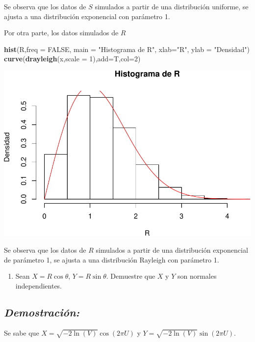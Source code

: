 \documentclass[]{article}
\newenvironment{Shaded}{\begin{snugshade}}{\end{snugshade}}
\newcommand{\KeywordTok}[1]{\textcolor[rgb]{0.13,0.29,0.53}{\textbf{#1}}}
\newcommand{\DataTypeTok}[1]{\textcolor[rgb]{0.13,0.29,0.53}{#1}}
\newcommand{\DecValTok}[1]{\textcolor[rgb]{0.00,0.00,0.81}{#1}}
\newcommand{\StringTok}[1]{\textcolor[rgb]{0.31,0.60,0.02}{#1}}
\newcommand{\OtherTok}[1]{\textcolor[rgb]{0.56,0.35,0.01}{#1}}
\newcommand{\NormalTok}[1]{#1}
\providecommand{\tightlist}{%
  \setlength{\itemsep}{0pt}\setlength{\parskip}{0pt}}
\begin{document}
Se observa que los datos de \(S\) simulados a partir de una distribución
uniforme, se ajusta a una distribución exponencial con parámetro 1.

Por otra parte, los datos simulados de \(R\)

\begin{Shaded}
\begin{Highlighting}[]
\KeywordTok{hist}\NormalTok{(R,}\DataTypeTok{freq =} \OtherTok{FALSE}\NormalTok{, }\DataTypeTok{main =} \StringTok{"Histograma de R"}\NormalTok{, }\DataTypeTok{xlab=}\StringTok{"R"}\NormalTok{, }\DataTypeTok{ylab =} \StringTok{"Densidad"}\NormalTok{)}
\KeywordTok{curve}\NormalTok{(}\KeywordTok{drayleigh}\NormalTok{(x,}\DataTypeTok{scale =} \DecValTok{1}\NormalTok{),}\DataTypeTok{add=}\NormalTok{T,}\DataTypeTok{col=}\DecValTok{2}\NormalTok{)}
\end{Highlighting}
\end{Shaded}

\includegraphics[width=0.63\linewidth]{notebook_simulaciones_files/figure-latex/unnamed-chunk-11-1}

Se observa que los datos de \(R\) simulados a partir de una distribución
exponencial de parámetro 1, se ajusta a una distribución Rayleigh con
parámetro 1.

\begin{enumerate}
\def\labelenumi{\alph{enumi}.}
\setcounter{enumi}{1}
\tightlist
\item
  Sean \(X=R \cos\theta\), \(Y=R\sin\theta\). Demuestre que \(X\) y
  \(Y\) son normales independientes.
\end{enumerate}

\subsection{\texorpdfstring{\emph{Demostración:}}{Demostración:}}\label{demostracion-3}

Se sabe que \(X=\sqrt{-2\ln(V)}\cos(2\pi U)\) y
\(Y=\sqrt{-2\ln(V)}\sin(2\pi U)\).
\end{document}

